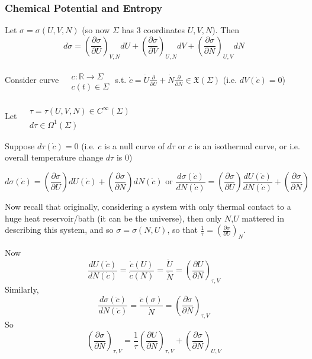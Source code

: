 \documentclass[twoside]{amsart}
\theoremstyle{plain}
\theoremstyle{definition}
\begin{document}
\subsubsection*{Chemical Potential and Entropy}

Let $\sigma = \sigma(U,V,N)$ (so now $\Sigma$ has 3 coordinates $U,V,N$).  Then
\[
d\sigma = \left( \frac{ \partial \sigma}{\partial U}\right)_{V,N}dU + \left( \frac{ \partial \sigma}{\partial V}\right)_{U,N} dV + \left( \frac{ \partial \sigma}{\partial N}\right)_{U,V}dN
\]

Consider curve $\begin{aligned} & \quad \\
  & c : \mathbb{R} \to \Sigma \\
  & c(t) \in \Sigma \end{aligned}$ s.t. $\dot{c} = \dot{U} \frac{ \partial }{ \partial U} + \dot{N} \frac{ \partial }{ \partial N} \in \mathfrak{X}(\Sigma)$ (i.e. $dV(\dot{c}) = 0$)

Let $\begin{aligned} & \quad \\
  & \tau = \tau(U,V, N) \in C^{\infty}(\Sigma) \\
  & d\tau \in \Omega^1(\Sigma) \end{aligned}$

Suppose $d\tau(\dot{c})=0$ (i.e. $c$ is a null curve of $d\tau$ or $c$ is an isothermal curve, or i.e. overall temperature change $d\tau $ is $0$)


\[
d\sigma(\dot{c}) = \left( \frac{ \partial \sigma }{ \partial U } \right) dU(\dot{c}) + \left( \frac{ \partial \sigma }{ \partial N} \right) dN(\dot{c}) \text{ or } \frac{d\sigma(\dot{c})}{ dN(\dot{c})} = \left( \frac{ \partial \sigma}{ \partial U} \right) \frac{dU(\dot{c})}{ dN(\dot{c})} + \left( \frac{ \partial \sigma}{ \partial N} \right)
\]

Now recall that originally, considering a system with only thermal contact to a huge heat reservoir/bath (it can be the universe), then only $N$,$U$ mattered in describing this system, and so $\sigma = \sigma(N,U)$, so that $\frac{1}{\tau} = \left( \frac{ \partial \sigma}{ \partial U}\right)_N$.  

Now \[
\frac{dU(\dot{c})}{dN(\dot{c})} = \frac{\dot{c}(U)}{\dot{c}(N)} = \frac{\dot{U}}{\dot{N}} = \left( \frac{ \partial U}{ \partial N} \right)_{\tau,V} 
\]
Similarly, 
\[
\frac{d\sigma(\dot{c})}{dN(\dot{c})} = \frac{\dot{c}(\sigma)}{ \dot{N}} = \left( \frac{\partial \sigma}{\partial N} \right)_{\tau,V}
\]
So
\[
\left( \frac{ \partial \sigma}{ \partial N} \right)_{\tau,V} = \frac{1}{\tau} \left( \frac{ \partial U}{ \partial N} \right)_{\tau,V} + \left( \frac{ \partial \sigma}{ \partial N} \right)_{U,V}
\]
\end{document}
